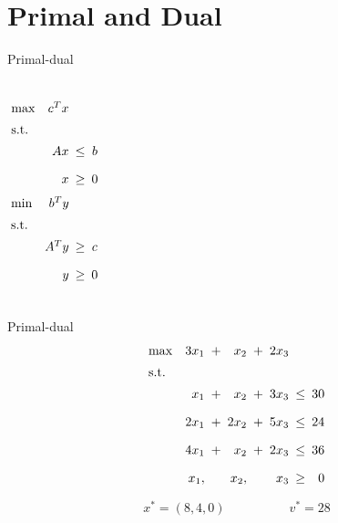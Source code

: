 \section{Primal and Dual}

\begin{frame}{Primal-dual}
  \begin{columns}
	  \begin{equation*}
		\setlength\arraycolsep{2.5pt}
		\begin{array}{l@{\quad}rcc}
		  \max 	& c^{T}x	&	&	\\[5pt]
		  \text{s.t.} 	&	&	&	\\[5pt]
				&	Ax 	&	\leq	&	b	\\[10pt]
				&	x	& 	\geq 	&	0	
		\end{array}
	  \end{equation*}
	  \begin{equation*}
		\setlength\arraycolsep{2.5pt}
		\begin{array}{l@{\quad}rcc}
		  \min 	& b^{T}y	&	&	\\[5pt]
		  \text{s.t.} 	&	&	&	\\[5pt]
				&	A^{T}y 	&	\geq	&	c	\\[10pt]
				&	y	& 	\geq 	&	0	
		\end{array}
	  \end{equation*}
  \end{columns}
\end{frame}
\begin{frame}{Primal-dual}
  \begin{equation*}
	\setlength\arraycolsep{2.5pt}
	\begin{array}{l@{\quad}rcrcrcr}
	  \max 	& 3x_1  &+&	x_2		&+&	2x_3	&	&	\\[5pt]
	  \text{s.t.} 	&	&	&	&	&	&	&	\\[5pt]
			& x_1   	&+&	x_2	&+&	3x_3	&\leq& 30 \\[10pt]
			& 2x_1	&+&	2x_2 	&+& 5x_3 	&\leq& 24 \\[10pt]
			& 4x_1   	&+&	x_2		&+&	2x_3	&\leq& 36	\\[10pt]
			& x_1,	&&	x_2,	&&	x_3	&\geq&	0
	\end{array}
  \end{equation*}

  \vspace{0.60cm}

  \[
	x^{\ast} = (8, 4, 0) \qquad\qquad\quad v^{\ast} = 28
  \]
\end{frame}
